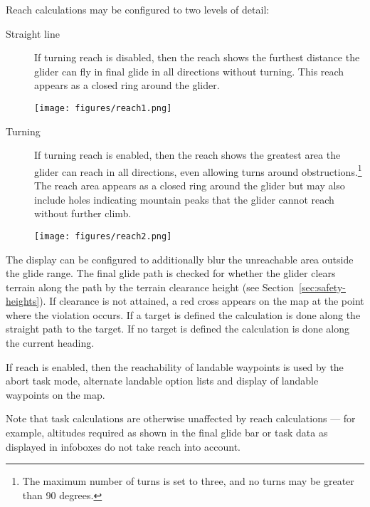 Reach calculations may be configured  to two levels of detail:
\begin{description}
\item[Straight line] If turning reach is disabled, then the reach shows the
 furthest distance the glider can fly in final glide in all directions without
 turning.  This reach appears as a closed ring around the glider.

\begin{center}
\texttt{[image: figures/reach1.png]}
\end{center}

\item[Turning] If turning reach is enabled, then the reach shows the
  greatest area the glider can reach in all directions, even allowing
  turns around obstructions.\footnote{The maximum number of turns is
    set to three, and no turns may be greater than 90 degrees.}  The
  reach area appears as a closed ring around the glider but may also
  include holes indicating mountain peaks that the glider cannot reach
  without further climb.

\begin{center}
\texttt{[image: figures/reach2.png]}
\end{center}

\end{description}

The display can be configured to additionally blur the unreachable area
outside the glide range. 
The final glide path is checked for whether the glider clears terrain along
the path by the terrain clearance height (see Section~\ref{sec:safety-heights}).
If clearance is not attained, a red
cross appears on the map at the point where the violation occurs. If a target is
defined the calculation is done along the straight path to the target. If no 
target is defined the calculation is done along the current heading.

If reach is enabled, then the reachability of landable waypoints is used
by the abort task mode, alternate landable option lists and display of
landable waypoints on the map.

Note that task calculations are otherwise unaffected by reach
calculations --- for example, altitudes required as shown in the final
glide bar or task data as displayed in infoboxes do not take reach into account.


